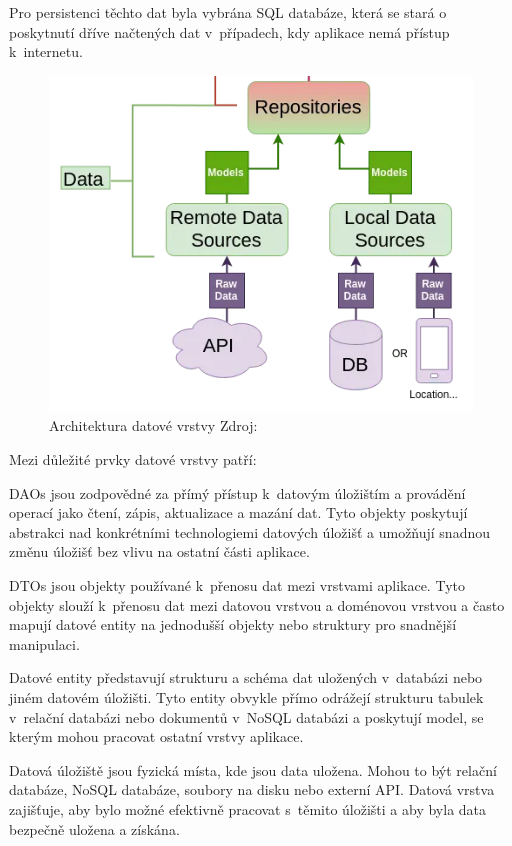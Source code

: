 Pro persistenci těchto dat byla vybrána SQL databáze, která se stará o poskytnutí dříve načtených dat v~případech, kdy aplikace nemá přístup k~internetu.


\begin{figure}[H]
  \centering
  \includegraphics[width=.5\textwidth]{data_layer_diagram.png}
  \caption{Architektura datové vrstvy Zdroj: \cite{imgDataFlow}}
  \label{fig:arch_data_layer}
\end{figure}


Mezi důležité prvky datové vrstvy patří:

DAOs jsou zodpovědné za přímý přístup k~datovým úložištím a provádění operací jako čtení, zápis, aktualizace a mazání dat. Tyto objekty 
poskytují abstrakci nad konkrétními technologiemi datových úložišť a umožňují snadnou změnu úložišť bez vlivu na ostatní části aplikace.

DTOs jsou objekty používané k~přenosu dat mezi vrstvami aplikace. Tyto objekty slouží k~přenosu dat mezi datovou vrstvou a doménovou 
vrstvou a často mapují datové entity na jednodušší objekty nebo struktury pro snadnější manipulaci.

Datové entity představují strukturu a schéma dat uložených v~databázi nebo jiném datovém úložišti. Tyto entity obvykle přímo odrážejí
strukturu tabulek v~relační databázi nebo dokumentů v~NoSQL databázi a poskytují model, se kterým mohou pracovat ostatní vrstvy aplikace.

Datová úložiště jsou fyzická místa, kde jsou data uložena. Mohou to být relační databáze, NoSQL databáze, soubory na disku nebo externí API. 
Datová vrstva zajišťuje, aby bylo možné efektivně pracovat s~těmito úložišti a aby byla data bezpečně uložena a získána.

